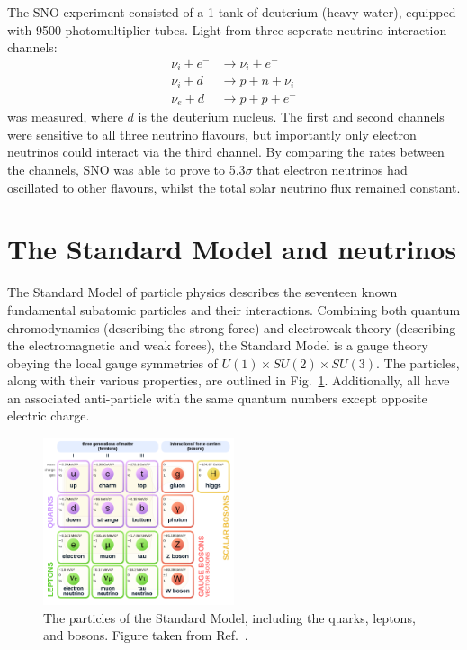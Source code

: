 The SNO experiment consisted of a \unit{1}{} tank of deuterium (heavy water),
equipped with 9500 photomultiplier tubes. Light from three seperate neutrino interaction channels:
\begin{align} %
    \nu_{i}+e^{-} & \rightarrow \nu_{i}+e^{-} \\
    \nu_{i}+d     & \rightarrow p+n+\nu_{i}   \\
    \nu_{e}+d     & \rightarrow p+p+e^{-}
\end{align}
was measured, where $d$ is the deuterium nucleus. The first and second channels were sensitive to
all three neutrino flavours, but importantly only electron neutrinos could interact via the third
channel. By comparing the rates between the channels, SNO was able to prove to 5.3$\sigma$ that
electron neutrinos had oscillated to other flavours, whilst the total solar neutrino flux remained
constant.

\section{The Standard Model and neutrinos} %
\label{sec:theory_sm} %

The Standard Model of particle physics describes the seventeen known fundamental subatomic
particles and their interactions. Combining both quantum chromodynamics (describing the strong
force) and electroweak theory (describing the electromagnetic and weak forces), the Standard Model
is a gauge theory obeying the local gauge symmetries of $U(1) \times SU(2) \times SU(3)$. The
particles, along with their various properties, are outlined in Fig.~\ref{fig:sm}. Additionally,
all have an associated anti-particle with the same quantum numbers except opposite electric
charge.

\begin{figure} %
    \includegraphics[origin=c,width=0.5\textwidth]{diagrams/3-theory/sm.png}
    \caption[The particles of the Standard Model]
    {The particles of the Standard Model, including the quarks, leptons, and bosons. Figure taken
        from Ref.~\cite{wiki2020}.}
    \label{fig:sm}
\end{figure}

